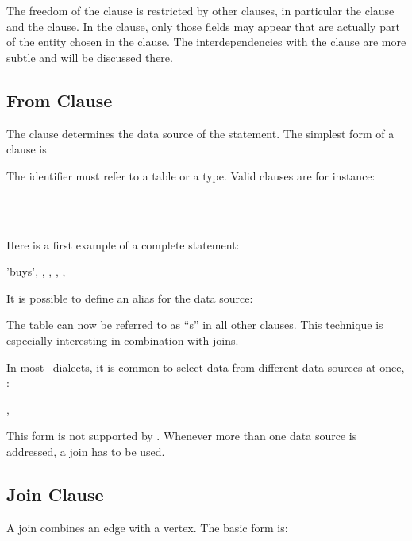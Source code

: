 The freedom of the  clause
is restricted by other clauses, in particular
the  clause and the  clause.
In the  clause, only
those fields may appear that are actually
part of the entity chosen in the  clause.
The interdependencies with the  clause
are more subtle and will be discussed there.

\subsection{From Clause}
The  clause determines the data source
of the  statement. The simplest form
of a  clause is

 

The identifier must refer to a table or a type.
Valid  clauses are for instance:

  \\
  \\
 

Here is a first example of a complete  statement:

 'buys', ,
                         , 
                         , 
                         ,
 

It is possible to define an alias for the data source:

   

The table  can now be referred to as ``s''
in all other clauses.
This technique is especially interesting in combination
with joins.

In most \sql\ dialects,
it is common to select data from different
data sources at once, \eg:

 , 

This form is not supported by \nowdb.
Whenever more than one data source is addressed,
a join has to be used.

\subsection{Join Clause}
A join combines an edge with a vertex.
The basic form is:

